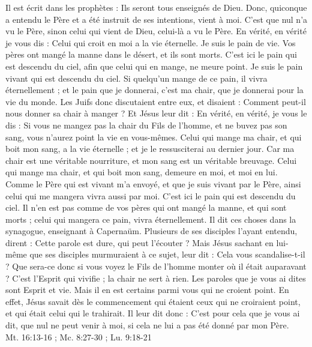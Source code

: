 \begin{multicols}{2}
Il est écrit dans les prophètes : Ils seront tous enseignés de Dieu. Donc, quiconque a entendu le Père et a été instruit de ses intentions, vient à moi.
C'est que nul n'a vu le Père, sinon celui qui vient de Dieu, celui-là a vu le Père.
En vérité, en vérité je vous dis : Celui qui croit en moi a la vie éternelle.
Je suis le pain de vie.
Vos pères ont mangé la manne dans le désert, et ils sont morts.
C'est ici le pain qui est descendu du ciel, afin que celui qui en mange, ne meure point.
Je suis le pain vivant qui est descendu du ciel. Si quelqu'un mange de ce pain, il vivra éternellement ; et le pain que je donnerai, c'est ma chair, que je donnerai pour la vie du monde.
Les Juifs donc discutaient entre eux, et disaient : Comment peut-il nous donner sa chair à manger ?
Et Jésus leur dit : En vérité, en vérité, je vous le dis : Si vous ne mangez pas la chair du Fils de l'homme, et ne buvez pas son sang, vous n'aurez point la vie en vous-mêmes.
Celui qui mange ma chair, et qui boit mon sang, a la vie éternelle ; et je le ressusciterai au dernier jour.
Car ma chair est une véritable nourriture, et mon sang est un véritable breuvage.
Celui qui mange ma chair, et qui boit mon sang, demeure en moi, et moi en lui.
Comme le Père qui est vivant m'a envoyé, et que je suis vivant par le Père, ainsi celui qui me mangera vivra aussi par moi.
C'est ici le pain qui est descendu du ciel. Il n'en est pas comme de vos pères qui ont mangé la manne, et qui sont morts ; celui qui mangera ce pain, vivra éternellement.
Il dit ces choses dans la synagogue, enseignant à Capernaüm.
Plusieurs de ses disciples l'ayant entendu, dirent : Cette parole est dure, qui peut l'écouter ?
Mais Jésus sachant en lui-même que ses disciples murmuraient à ce sujet, leur dit : Cela vous scandalise-t-il ?
Que sera-ce donc si vous voyez le Fils de l'homme monter où il était auparavant ?
C'est l'Esprit qui vivifie ; la chair ne sert à rien. Les paroles que je vous ai dites sont Esprit et vie.
Mais il en est certains parmi vous qui ne croient point. En effet, Jésus savait dès le commencement qui étaient ceux qui ne croiraient point, et qui était celui qui le trahirait.
Il leur dit donc : C'est pour cela que je vous ai dit, que nul ne peut venir à moi, si cela ne lui a pas été donné par mon Père.
\\{Mt. 16:13-16 ; Mc. 8:27-30 ; Lu. 9:18-21}

\end{multicols}
